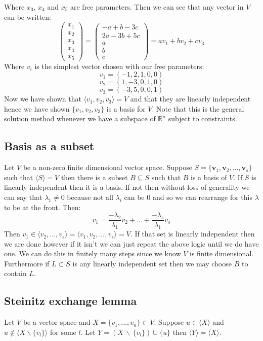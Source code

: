\documentclass[12pt]{article}
\newcommand{\arbvec}[2]{\ensuremath{\textbf{#1}_1,\textbf{#1}_2,\dots,\textbf{#1}_{#2}}}
\begin{document}
Where \(x_3,\,x_4\) and \(x_5\) are free parameters. Then we can see that any vector in \(V\) can be written:
\[\begin{pmatrix}
    x_1\\x_2\\x_3\\x_4\\x_5
\end{pmatrix}=\begin{pmatrix}
    -a+b-3c\\2a-3b+5c\\a\\b\\c
\end{pmatrix}=av_1+bv_2+cv_3\]
Where \(v_i\) is the simplest vector chosen with our free parameters:
\[v_1=(-1,2,1,0,0)\]
\[v_2=(1,-3,0,1,0)\]
\[v_3=(-3,5,0,0,1)\]
Now we have shown that \(\langle v_1,v_2,v_3\rangle=V\) and that they are linearly independent hence we have shown \(\{v_1,v_2,v_3\}\) is a basis for \(V\). Note that this is the general solution method whenever we have a subspace of \(\mathbb{R}^n\) subject to constraints.
\subsection*{Basis as a subset}
Let \(V\) be a non-zero finite dimensional vector space. Suppose \(S=\{\arbvec{v}{s}\}\) such that \(\langle S\rangle=V\) then there is a subset \(B\subseteq S\) such that \(B\) is a basis of \(V\). If \(S\) is linearly independent then it is a basis. If not then without loss of generality we can say that \(\lambda_1\ne0\) because not all \(\lambda_i\) can be \(0\) and so we can rearrange for this \(\lambda\) to be at the front. Then:
\[v_1=\frac{-\lambda_2}{\lambda_1}v_2+\dots+\frac{-\lambda_s}{\lambda_1}v_s\]
Then \(v_1\in\langle v_2,...,v_s\rangle =\langle v_1,v_2,...,v_s\rangle =V\). If that set is linearly independent then we are done however if it isn't we can just repeat the above logic until we do have one. We can do this in finitely many steps since we know \(V\) is finite dimensional. Furthermore if \(L\subset S\) is any linearly independent set then we may choose \(B\) to contain \(L\).
\subsection*{Steinitz exchange lemma}
Let \(V\) be a vector space and \(X=\{v_1,...,v_n\}\subset V\). Suppose \(u\in\langle X\rangle\) and \(u\notin \langle X\backslash \{v_l\}\rangle\) for some \(l\). Let \(Y=(X\,\backslash\,\{v_l\})\cup\{u\}\) then \(\langle Y\rangle =\langle X\rangle\).
\end{document}

